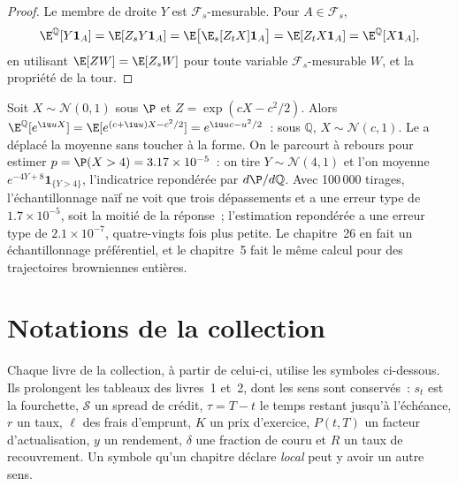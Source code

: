 \begin{proof}
Le membre de droite $Y$ est $\mathcal F_s$-mesurable. Pour $A \in \mathcal F_s$,
\[
\E^{\mathbb Q}[Y\mathbf 1_A] = \E[Z_sY\mathbf 1_A] = \E\bigl[\E_s[Z_tX]\mathbf 1_A\bigr] =
\E[Z_tX\mathbf 1_A] = \E^{\mathbb Q}[X\mathbf 1_A],
\]
en utilisant $\E[Z W] = \E[Z_s W]$ pour toute variable $\mathcal F_s$-mesurable $W$, et la propriété de la tour.
\end{proof}

\begin{example}\label{ex:qm:probability-at-speed:shift}
Soit $X \sim \mathcal N(0, 1)$ sous $\P$ et $Z = \exp(cX - c^2/2)$. Alors $\E^{\mathbb
Q}[e^{\iu uX}] = \E[e^{(c + \iu u)X - c^2/2}] = e^{\iu uc - u^2/2}$~: sous $\mathbb Q$, $X \sim
\mathcal N(c, 1)$. Le  a déplacé la moyenne sans toucher à la forme. On le parcourt à
rebours pour estimer $p = \P(X > 4) = 3.17 \times 10^{-5}$~: on tire $Y \sim \mathcal N(4, 1)$
et l'on moyenne $e^{-4Y + 8}\mathbf 1_{\{Y > 4\}}$, l'indicatrice repondérée par $d\P/d\mathbb Q$.
Avec 100\,000 tirages, l'échantillonnage naïf ne voit que trois dépassements et a une erreur type de $1.7
\times 10^{-5}$, soit la moitié de la réponse~; l'estimation repondérée a une erreur type de $2.1 \times
10^{-7}$, quatre-vingts fois plus petite. Le chapitre~26 en fait un échantillonnage préférentiel, et le chapitre~5
fait le même calcul pour des trajectoires browniennes entières.
\end{example}

\section{Notations de la collection}\label{sec:qm:probability-at-speed:notation}

Chaque livre de la collection, à partir de celui-ci, utilise les symboles ci-dessous. Ils prolongent les tableaux des
livres~1 et~2, dont les sens sont conservés~: $s_t$ est la fourchette, $\mathcal S$
un spread de crédit, $\tau = T - t$ le temps restant jusqu'à l'échéance, $r$ un taux, $\ell$ des frais d'emprunt, $K$ un
prix d'exercice, $P(t,T)$ un facteur d'actualisation, $y$ un rendement, $\delta$ une fraction de couru et $R$ un
taux de recouvrement. Un symbole qu'un chapitre déclare \emph{local} peut y avoir un autre sens.

